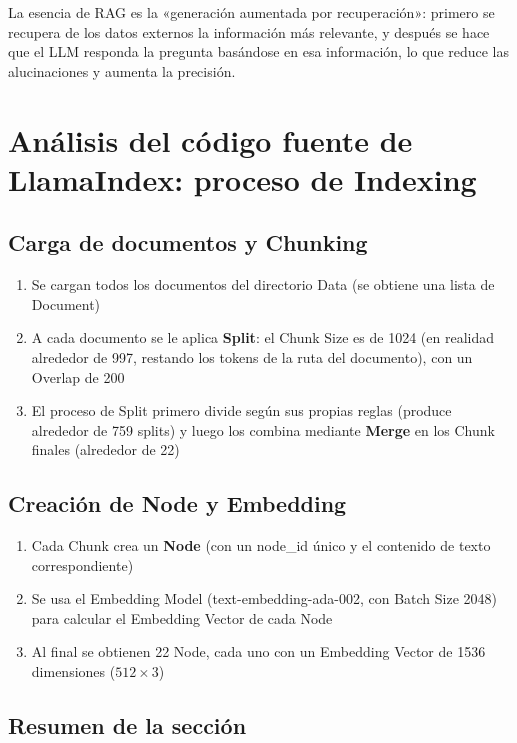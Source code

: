 \documentclass[a4paper]{article}
\begin{document}
La esencia de RAG es la «generación aumentada por recuperación»: primero se recupera de los datos externos la información más relevante, y después se hace que el LLM responda la pregunta basándose en esa información, lo que reduce las alucinaciones y aumenta la precisión.

\section{Análisis del código fuente de LlamaIndex: proceso de Indexing}

\subsection{Carga de documentos y Chunking}

\begin{enumerate}
    \item Se cargan todos los documentos del directorio Data (se obtiene una lista de Document)
    \item A cada documento se le aplica \textbf{Split}: el Chunk Size es de 1024 (en realidad alrededor de 997, restando los tokens de la ruta del documento), con un Overlap de 200
    \item El proceso de Split primero divide según sus propias reglas (produce alrededor de 759 splits) y luego los combina mediante \textbf{Merge} en los Chunk finales (alrededor de 22)
\end{enumerate}

\subsection{Creación de Node y Embedding}

\begin{enumerate}
    \item Cada Chunk crea un \textbf{Node} (con un node\_id único y el contenido de texto correspondiente)
    \item Se usa el Embedding Model (text-embedding-ada-002, con Batch Size 2048) para calcular el Embedding Vector de cada Node
    \item Al final se obtienen 22 Node, cada uno con un Embedding Vector de 1536 dimensiones ($512 \times 3$)
\end{enumerate}

\subsection{Resumen de la sección}
\end{document}
